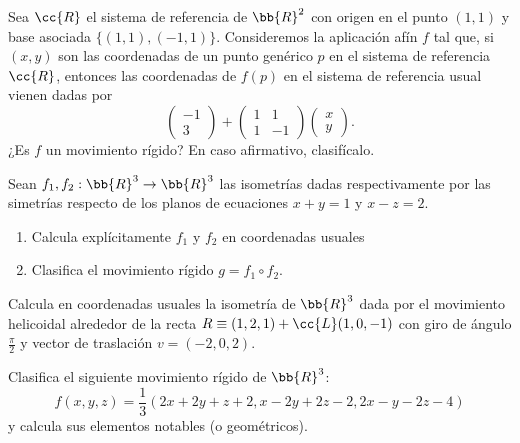 \begin{ejercicio}
    Sea $\cc{R}$ el sistema de referencia de $\bb{R}^2$ con origen en el punto $(1, 1)$ y base asociada $\{(1, 1),(-1, 1)\}$. Consideremos la aplicación afín $f$ tal que, si $(x, y)$ son las coordenadas de un punto genérico $p$ en el sistema de referencia $\cc{R}$, entonces las coordenadas de $f(p)$ en el sistema de referencia usual vienen dadas por
    \begin{equation*}
        \left(\begin{array}{c}
            -1 \\ 3
        \end{array}\right)+
        \left(\begin{array}{cc}
            1 & 1 \\ 1 & -1
        \end{array}\right)
        \left(\begin{array}{c}
            x \\ y
        \end{array}\right).
    \end{equation*}
    ¿Es $f$ un movimiento rígido? En caso afirmativo, clasifícalo.
\end{ejercicio}

\begin{ejercicio}
    Sean $f_1, f_2 : \bb{R}^3\to \bb{R}^3$ las isometrías dadas respectivamente por las simetrías respecto de los planos de ecuaciones $x + y = 1$ y $x - z = 2$.
    \begin{enumerate}
        \item Calcula explícitamente $f_1$ y $f_2$ en coordenadas usuales
        \item Clasifica el movimiento rígido $g = f_1 \circ f_2$.
    \end{enumerate}
\end{ejercicio}

\begin{ejercicio}
    Calcula en coordenadas usuales la isometría de $\bb{R}^3$ dada por el movimiento helicoidal alrededor de la recta $R \equiv (1, 2, 1) + \cc{L}(1, 0, -1)$ con giro de ángulo $\frac{\pi}{2}$ y vector de traslación $v = (-2, 0, 2)$.
\end{ejercicio}

\begin{ejercicio}
     Clasifica el siguiente movimiento rígido de $\bb{R}^3$:
     \begin{equation*}
         f(x, y, z) = \frac{1}{3}(2x + 2y + z + 2, x - 2y + 2z - 2, 2x - y - 2z - 4)
     \end{equation*}
     y calcula sus elementos notables (o geométricos).
\end{ejercicio}

